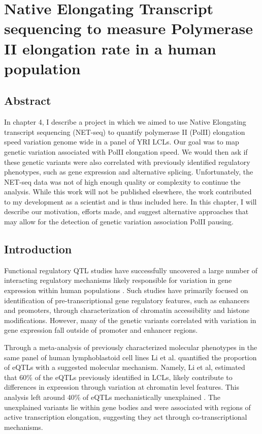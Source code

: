 \chapter{Native Elongating Transcript sequencing to measure Polymerase II elongation rate in a human population}\label{ch:singleCellSeq}

\section{Abstract}\label{ch04-abstract}


In chapter 4, I describe a project in which we aimed to use Native Elongating transcript sequencing (NET-seq) to quantify polymerase II (PolII) elongation speed variation genome wide in a panel of YRI LCLs. Our goal was to map genetic variation associated with PolII elongation speed. We would then ask if these genetic variants were also correlated with previously identified regulatory phenotypes, such as gene expression and alternative splicing. Unfortunately, the NET-seq data was not of high enough quality or complexity to continue the analysis. While this work will not be published elsewhere, the work contributed to my development as a scientist and is thus included here. In this chapter, I will describe our motivation, efforts made, and suggest alternative approaches that may allow for the detection of genetic variation association PolII pausing.  



\clearpage

\section{Introduction}\label{ch04-introduction}

Functional regulatory QTL studies have successfully uncovered a large number of interacting regulatory mechanisms likely responsible for variation in gene expression within human populations \citep{li_rna_2016, McVicker2013, degner_dnase_2012, gaffney_dissecting_2012, battle_genomic_2015}. Such studies have primarily focused on identification of pre-transcriptional gene regulatory features, such as enhancers and promoters, through characterization of chromatin accessibility and histone modifications. However, many of the genetic variants correlated with variation in gene expression fall outside of promoter and enhancer regions.  


Through a meta-analysis of previously characterized molecular phenotypes in the same panel of human lymphoblastoid cell lines Li et al. quantified the proportion of eQTLs with a suggested molecular mechanism. Namely, Li et al, estimated that 60\% of the eQTLs previously identified in LCLs, likely contribute to differences in expression through variation at chromatin level features. This analysis left around 40\% of eQTLs mechanistically unexplained \citep{li_rna_2016}. The unexplained variants lie within gene bodies and were associated with regions of active transcription elongation, suggesting they act through co-transcriptional mechanisms. 

